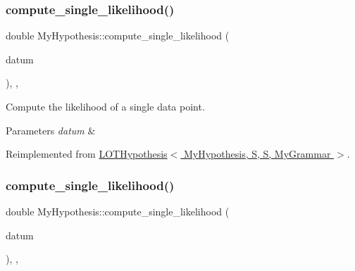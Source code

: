 \subsubsection{\texorpdfstring{compute\+\_\+single\+\_\+likelihood()}{compute\_single\_likelihood()}\hspace{0.1cm}{\footnotesize\ttfamily [3/5]}}
{\footnotesize\ttfamily double My\+Hypothesis\+::compute\+\_\+single\+\_\+likelihood (\begin{DoxyParamCaption}\item[{const \hyperlink{class_bayesable_a9f1a6c0cd7855550fa10b1a8f13a5867}{datum\+\_\+t} \&}]{datum }\end{DoxyParamCaption})\hspace{0.3cm}{\ttfamily [inline]}, {\ttfamily [override]}, {\ttfamily [virtual]}}



Compute the likelihood of a single data point. 


\begin{DoxyParams}{Parameters}
{\em datum} & \\
\hline
\end{DoxyParams}


Reimplemented from \hyperlink{class_l_o_t_hypothesis_a0ff11e5e328fcfa819a8dd9b5d57bd65}{L\+O\+T\+Hypothesis$<$ My\+Hypothesis, S, S, My\+Grammar $>$}.

\mbox{\label{class_my_hypothesis_a480fc9e50d0faa0f5226f56187fd2eec}} 
\subsubsection{\texorpdfstring{compute\+\_\+single\+\_\+likelihood()}{compute\_single\_likelihood()}\hspace{0.1cm}{\footnotesize\ttfamily [4/5]}}
{\footnotesize\ttfamily double My\+Hypothesis\+::compute\+\_\+single\+\_\+likelihood (\begin{DoxyParamCaption}\item[{const \hyperlink{class_bayesable_a9f1a6c0cd7855550fa10b1a8f13a5867}{datum\+\_\+t} \&}]{datum }\end{DoxyParamCaption})\hspace{0.3cm}{\ttfamily [inline]}, {\ttfamily [override]}, {\ttfamily [virtual]}}



